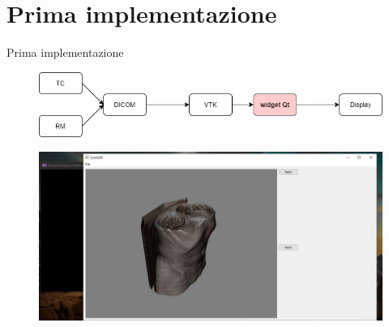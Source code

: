 \documentclass{beamer}
\begin{document}
	
	\section{Prima implementazione}
	\begin{frame}{Prima implementazione}
	
	\begin{figure}[ht]
    	\centering
    	\includegraphics[width=1\textwidth]{Images/primaimplementazione.png}
	\end{figure}
	
	\begin{figure}[ht]
    	\centering
    	\includegraphics[width=1\textwidth]{Images/firstvolume.jpg}
	\end{figure}	
	
	\end{frame}
	
	
\end{document}
